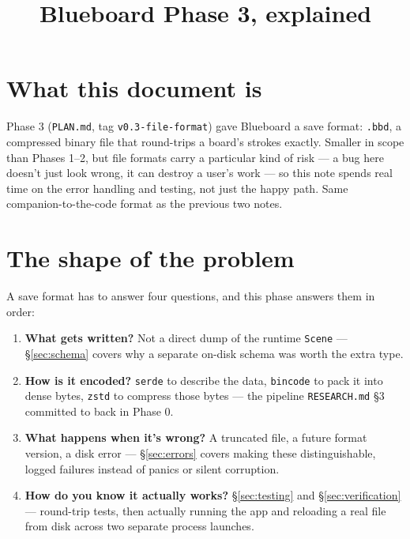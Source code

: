 \documentclass[11pt]{article}
\title{Blueboard Phase 3, explained}
\author{}
\date{}
\begin{document}
\maketitle

\section*{What this document is}
Phase 3 (\texttt{PLAN.md}, tag \texttt{v0.3-file-format}) gave Blueboard a save format:
\texttt{.bbd}, a compressed binary file that round-trips a board's strokes exactly. Smaller
in scope than Phases 1--2, but file formats carry a particular kind of risk — a bug here
doesn't just look wrong, it can destroy a user's work — so this note spends real time on
the error handling and testing, not just the happy path. Same companion-to-the-code format
as the previous two notes.

\tableofcontents

\section{The shape of the problem}
A save format has to answer four questions, and this phase answers them in order:
\begin{enumerate}
  \item \textbf{What gets written?} Not a direct dump of the runtime \texttt{Scene} —
    \S\ref{sec:schema} covers why a separate on-disk schema was worth the extra type.
  \item \textbf{How is it encoded?} \texttt{serde} to describe the data, \texttt{bincode}
    to pack it into dense bytes, \texttt{zstd} to compress those bytes — the pipeline
    \texttt{RESEARCH.md} §3 committed to back in Phase 0.
  \item \textbf{What happens when it's wrong?} A truncated file, a future format version, a
    disk error — \S\ref{sec:errors} covers making these distinguishable, logged failures
    instead of panics or silent corruption.
  \item \textbf{How do you know it actually works?} \S\ref{sec:testing} and
    \S\ref{sec:verification} — round-trip tests, then actually running the app and
    reloading a real file from disk across two separate process launches.
\end{enumerate}
\end{document}
